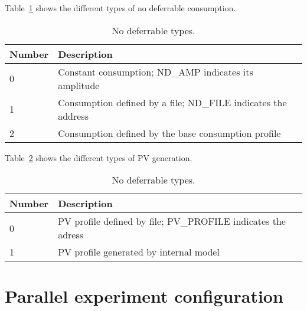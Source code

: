 %
Table~\ref{tab:ND_conf} shows the different types of no deferrable consumption. 
%
\begin{table}[h]
	\begin{center}	
	\begin{tabular}{|m{3.5cm}|m{12cm}|} \hline		
		{\bf Number} 	& {\bf Description} 			   	        	\\ \hline
		0		& Constant consumption; ND\_AMP indicates its amplitude	  	\\ \hline
		1		& Consumption defined by a file; ND\_FILE indicates the address	\\ \hline
		2		& Consumption defined by the base consumption profile		\\ \hline	
	\end{tabular}
	\caption{No deferrable types.}
	\label{tab:ND_conf}
	\end{center}
\end{table}

%
Table~\ref{tab:PV_conf} shows the different types of PV generation. 
%
\begin{table}[h]
	\begin{center}	
	\begin{tabular}{|m{3.5cm}|m{12cm}|} \hline		
		{\bf Number} 	& {\bf Description} 			   	        	\\ \hline
		0		& PV profile defined by file; PV\_PROFILE indicates the adress	\\ \hline
		1		& PV profile generated by internal model			\\ \hline	
	\end{tabular}
	\caption{No deferrable types.}
	\label{tab:PV_conf}
	\end{center}
\end{table}

%
\section{Parallel experiment configuration}
\label{exe:parallel_cnf}


































